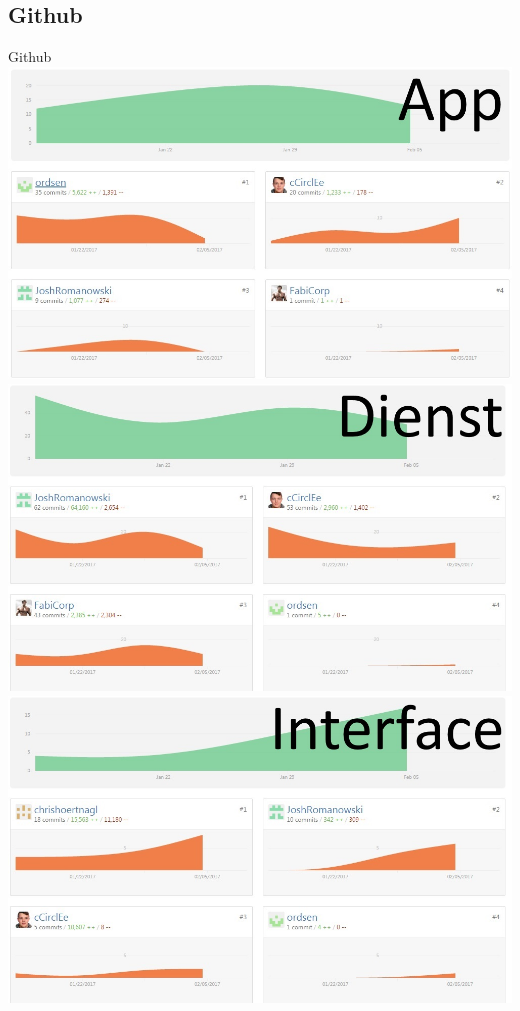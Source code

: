 \documentclass[19pt]{beamer}
\begin{document}
\subsection{Github}
\begin{frame}{Github}
\includegraphics[scale=0.2]{resources/GithubApp.jpg}
\includegraphics[scale=0.2]{resources/GithubService.jpg} \\
\includegraphics[scale=0.2]{resources/GithubInterface.jpg}

\end{frame}
\end{document}
